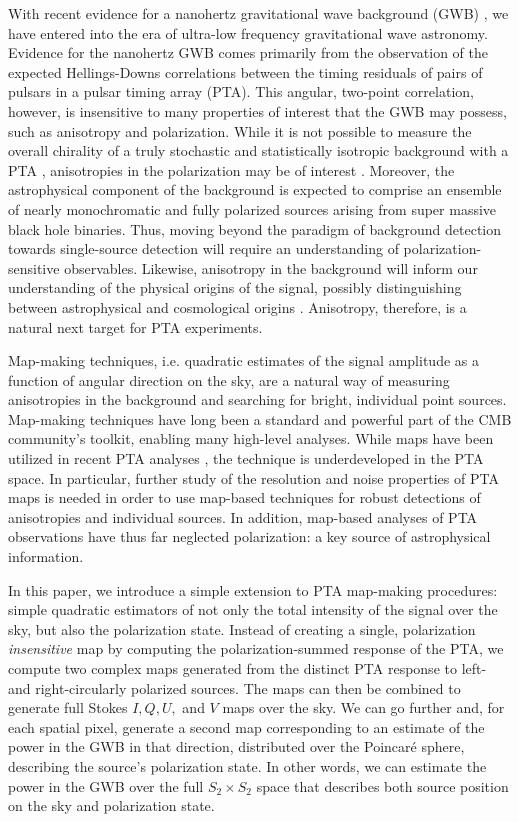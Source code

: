 \documentclass[%
 reprint,
nofootinbib,
 amsmath,amssymb,
 aps,
]{revtex4-2}
\begin{document}
With recent evidence for a nanohertz gravitational wave background (GWB) \citep{NANOGravdetection, IPTAdetection, EPTAdetection, CPTAdetection, Parkesdetection}, we have entered into the era of ultra-low frequency gravitational wave astronomy. Evidence for the nanohertz GWB comes primarily from the observation of the expected Hellings-Downs correlations between the timing residuals of pairs of pulsars in a pulsar timing array (PTA). This angular, two-point correlation, however, is insensitive to many properties of interest that the GWB may possess, such as anisotropy and polarization. While it is not possible to measure the overall chirality of a truly stochastic and statistically isotropic background with a PTA \citep{Kato2016, Belgacem}, anisotropies in the polarization may be of interest \citep{Kumar2024, SatoPolitoKamionkowski2024}. Moreover, the astrophysical component of the background is expected to comprise an ensemble of nearly monochromatic and fully polarized sources arising from super massive black hole binaries. Thus, moving beyond the paradigm of background detection towards single-source detection will require an understanding of polarization-sensitive observables. Likewise, anisotropy in the background will inform our understanding of the physical origins of the signal, possibly distinguishing between astrophysical and cosmological origins \citep{SatoPolito2024}. Anisotropy, therefore, is a natural next target for PTA experiments. 

Map-making techniques, i.e. quadratic estimates of the signal amplitude as a function of angular direction on the sky, are a natural way of measuring anisotropies in the background and searching for bright, individual point sources. Map-making techniques have long been a standard and powerful part of the CMB community's toolkit, enabling many high-level analyses. While maps have been utilized in recent PTA analyses \citep{Nanograv2023Anisotropy, Lemke2024, Grunthal2025}, the technique is underdeveloped in the PTA space. In particular, further study of the resolution and noise properties of PTA maps is needed in order to use map-based techniques for robust detections of anisotropies and individual sources. In addition, map-based analyses of PTA observations have thus far neglected polarization: a key source of astrophysical information.

In this paper, we introduce a simple extension to PTA map-making procedures: simple quadratic estimators of not only the total intensity of the signal over the sky, but also the polarization state. Instead of creating a single, polarization \textit{insensitive} map by computing the polarization-summed response of the PTA, we compute two complex maps generated from the distinct PTA response to left- and right-circularly polarized sources. The maps can then be combined to generate full Stokes $I, Q, U,$ and $V$ maps over the sky. We can go further and, for each spatial pixel, generate a second map corresponding to an estimate of the power in the GWB in that direction, distributed over the Poincar\'e sphere, describing the source's polarization state. In other words, we can estimate the power in the GWB over the full $S_2 \times S_2$ space that describes both source position on the sky and polarization state. 
\end{document}
